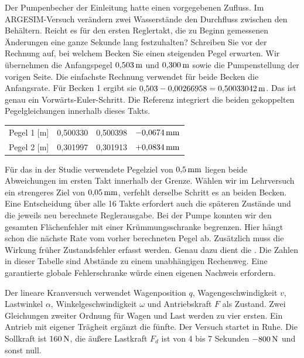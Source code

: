 Der Pumpenbecher der Einleitung hatte einen vorgegebenen Zufluss. Im ARGESIM-Versuch verändern zwei Wasserstände den Durchfluss zwischen den Behältern. Reicht es für den ersten Reglertakt, die zu Beginn gemessenen Änderungen eine ganze Sekunde lang festzuhalten? Schreiben Sie vor der Rechnung auf, bei welchem Becken Sie einen steigenden Pegel erwarten.
Wir übernehmen die Anfangspegel \(0{,}503\,\mathrm{m}\) und \(0{,}300\,\mathrm{m}\) sowie die Pumpenstellung der vorigen Seite. Die einfachste Rechnung verwendet für beide Becken die Anfangsrate. Für Becken 1 ergibt sie \(0{,}503-0{,}00266958=0{,}50033042\,\mathrm{m}\). Das ist genau ein Vorwärts-Euler-Schritt. Die Referenz integriert die beiden gekoppelten Pegelgleichungen innerhalb dieses Takts.
{\tblstart\begin{tabularx}{\linewidth}{@{}Y r r r@{}}\toprule
{}&&&\\\midrule
Pegel 1 [m]&0,500330&0,500398&\(-0{,}0674\,\mathrm{mm}\)\\
Pegel 2 [m]&0,301997&0,301913&\(+0{,}0834\,\mathrm{mm}\)\\\bottomrule\end{tabularx}\par}
Für das in der Studie verwendete Pegelziel von \(0{,}5\,\mathrm{mm}\) liegen beide Abweichungen im ersten Takt innerhalb der Grenze. Wählen wir im Lehrversuch ein strengeres Ziel von \(0{,}05\,\mathrm{mm}\), verfehlt derselbe Schritt es an beiden Becken. Eine Entscheidung über alle 16 Takte erfordert auch die späteren Zustände und die jeweils neu berechnete Reglerausgabe.
Bei der Pumpe konnten wir den gesamten Flächenfehler mit einer Krümmungsschranke begrenzen. Hier hängt schon die nächste Rate vom vorher berechneten Pegel ab. Zusätzlich muss die Wirkung früher Zustandsfehler erfasst werden. Genau dazu dient die . Die Zahlen in dieser Tabelle sind Abstände zu einem unabhängigen Rechenweg. Eine garantierte globale Fehlerschranke würde einen eigenen Nachweis erfordern.

Der lineare Kranversuch verwendet Wagenposition \(q\), Wagengeschwindigkeit \(v\), Lastwinkel \(\alpha\), Winkelgeschwindigkeit \(\omega\) und Antriebskraft \(F\) als Zustand. Zwei Gleichungen zweiter Ordnung für Wagen und Last werden zu vier ersten. Ein Antrieb mit eigener Trägheit ergänzt die fünfte. Der Versuch startet in Ruhe. Die Sollkraft ist \(160\,\mathrm{N}\), die äußere Lastkraft \(F_d\) ist von 4 bis 7 Sekunden \(-800\,\mathrm{N}\) und sonst null.

